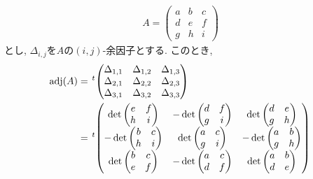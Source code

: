 \begin{example}
  \begin{align*}
    A=\begin{pmatrix}a&b&c\\d&e&f\\g&h&i\end{pmatrix}
  \end{align*}
  とし,
  $\Delta_{i,j}$を$A$の$(i,j)$-余因子とする.
  このとき,
  \begin{align*}
    \operatorname{adj}(A)
    &={\left.^{t}\!
      \begin{pmatrix}
        \Delta_{1,1}&\Delta_{1,2}&\Delta_{1,3}\\
        \Delta_{2,1}&\Delta_{2,2}&\Delta_{2,3}\\
        \Delta_{3,1}&\Delta_{3,2}&\Delta_{3,3}
      \end{pmatrix}\right.}\\
    &={\left.^{t}\!
      \begin{pmatrix}
        \det\begin{pmatrix}e&f\\h&i\end{pmatrix}&
        -\det\begin{pmatrix}d&f\\g&i\end{pmatrix}&
        \det\begin{pmatrix}d&e\\g&h\end{pmatrix}\\            
        -\det\begin{pmatrix}b&c\\h&i\end{pmatrix}&
        \det\begin{pmatrix}a&c\\g&i\end{pmatrix}&
        -\det\begin{pmatrix}a&b\\g&h\end{pmatrix}\\            
        \det\begin{pmatrix}b&c\\e&f\end{pmatrix}&
        -\det\begin{pmatrix}a&c\\d&f\end{pmatrix}&
        \det\begin{pmatrix}a&b\\d&e\end{pmatrix}            

\end{pmatrix}\right.}
\end{align*}
\end{example}

